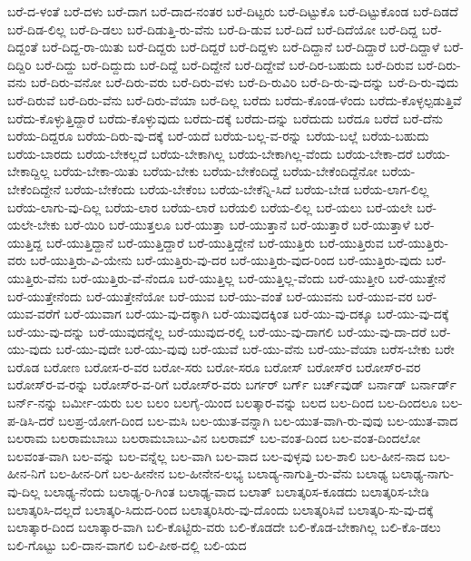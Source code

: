 {ಬರೆ-ದ-ಳಂತೆ
ಬರೆ-ದಳು
ಬರೆ-ದಾಗ
ಬರೆ-ದಾದ-ನಂತರ
ಬರೆ-ದಿಟ್ಟರು
ಬರೆ-ದಿಟ್ಟುಕೊ
ಬರೆ-ದಿಟ್ಟುಕೊಂಡ
ಬರೆ-ದಿಡದೆ
ಬರೆ-ದಿಡ-ಲಿಲ್ಲ
ಬರೆ-ದಿ-ಡಲು
ಬರೆ-ದಿಡುತ್ತಿ-ರು-ವೆನು
ಬರೆ-ದಿ-ಡುವ
ಬರೆ-ದಿದೆ
ಬರೆ-ದಿದೆಯೋ
ಬರೆ-ದಿದ್ದ
ಬರೆ-ದಿದ್ದಂತೆ
ಬರೆ-ದಿದ್ದ-ರಾ-ಯಿತು
ಬರೆ-ದಿದ್ದರು
ಬರೆ-ದಿದ್ದರೆ
ಬರೆ-ದಿದ್ದಳು
ಬರೆ-ದಿದ್ದಾನೆ
ಬರೆ-ದಿದ್ದಾರೆ
ಬರೆ-ದಿದ್ದಾಳೆ
ಬರೆ-ದಿದ್ದಿರಿ
ಬರೆ-ದಿದ್ದು
ಬರೆ-ದಿದ್ದುದು
ಬರೆ-ದಿದ್ದೆ
ಬರೆ-ದಿದ್ದೇನೆ
ಬರೆ-ದಿದ್ದೇವೆ
ಬರೆ-ದಿರ-ಬಹುದು
ಬರೆ-ದಿರುವ
ಬರೆ-ದಿರು-ವನು
ಬರೆ-ದಿರು-ವನೋ
ಬರೆ-ದಿರು-ವರು
ಬರೆ-ದಿರು-ವಳು
ಬರೆ-ದಿ-ರುವಿರಿ
ಬರೆ-ದಿ-ರು-ವು-ದನ್ನು
ಬರೆ-ದಿ-ರು-ವುದು
ಬರೆ-ದಿರುವೆ
ಬರೆ-ದಿರು-ವೆನು
ಬರೆ-ದಿರು-ವೆಯಾ
ಬರೆ-ದಿಲ್ಲ
ಬರೆದು
ಬರೆದು-ಕೊಂಡ-ಳೆಂದು
ಬರೆದು-ಕೊಳ್ಳಲ್ಪಡುತ್ತಿವೆ
ಬರೆದು-ಕೊಳ್ಳುತ್ತಿದ್ದಾರೆ
ಬರೆದು-ಕೊಳ್ಳುವುದು
ಬರೆದು-ದಕ್ಕೆ
ಬರೆದು-ದನ್ನು
ಬರೆದುದು
ಬರೆದೂ
ಬರೆದೆ
ಬರೆ-ದೆನು
ಬರೆಯ-ದಿದ್ದರೂ
ಬರೆಯ-ದಿರು-ವು-ದಕ್ಕೆ
ಬರೆ-ಯದೆ
ಬರೆಯ-ಬಲ್ಲ-ವ-ರನ್ನು
ಬರೆಯ-ಬಲ್ಲೆ
ಬರೆಯ-ಬಹುದು
ಬರೆಯ-ಬಾರದು
ಬರೆಯ-ಬೇಕಲ್ಲದೆ
ಬರೆಯ-ಬೇಕಾಗಿಲ್ಲ
ಬರೆಯ-ಬೇಕಾಗಿಲ್ಲ-ವೆಂದು
ಬರೆಯ-ಬೇಕಾ-ದರೆ
ಬರೆಯ-ಬೇಕಾದ್ದಿಲ್ಲ
ಬರೆಯ-ಬೇಕಾ-ಯಿತು
ಬರೆಯ-ಬೇಕು
ಬರೆಯ-ಬೇಕೆಂದಿದ್ದೆ
ಬರೆಯ-ಬೇಕೆಂದಿದ್ದೆನೋ
ಬರೆಯ-ಬೇಕೆಂದಿದ್ದೇನೆ
ಬರೆಯ-ಬೇಕೆಂದು
ಬರೆಯ-ಬೇಕೆಂಬ
ಬರೆಯ-ಬೇಕೆನ್ನಿ-ಸಿದೆ
ಬರೆಯ-ಬೇಡ
ಬರೆಯ-ಲಾಗ-ಲಿಲ್ಲ
ಬರೆಯ-ಲಾಗು-ವು-ದಿಲ್ಲ
ಬರೆಯ-ಲಾರ
ಬರೆಯ-ಲಾರೆ
ಬರೆಯಲಿ
ಬರೆಯ-ಲಿಲ್ಲ
ಬರೆ-ಯಲು
ಬರೆ-ಯಲೇ
ಬರೆ-ಯಲೇ-ಬೇಕು
ಬರೆ-ಯಿರಿ
ಬರೆ-ಯುತ್ತಲೂ
ಬರೆ-ಯುತ್ತಾ
ಬರೆ-ಯುತ್ತಾನೆ
ಬರೆ-ಯುತ್ತಾರೆ
ಬರೆ-ಯುತ್ತಾಳೆ
ಬರೆ-ಯುತ್ತಿದ್ದ
ಬರೆ-ಯುತ್ತಿದ್ದಾನೆ
ಬರೆ-ಯುತ್ತಿದ್ದಾರೆ
ಬರೆ-ಯುತ್ತಿದ್ದೇನೆ
ಬರೆ-ಯುತ್ತಿರು
ಬರೆ-ಯುತ್ತಿರುವ
ಬರೆ-ಯುತ್ತಿರು-ವರು
ಬರೆ-ಯುತ್ತಿರು-ವಿ-ಯೇನು
ಬರೆ-ಯುತ್ತಿರು-ವು-ದರ
ಬರೆ-ಯುತ್ತಿರು-ವುದ-ರಿಂದ
ಬರೆ-ಯುತ್ತಿರು-ವುದು
ಬರೆ-ಯುತ್ತಿರು-ವೆನು
ಬರೆ-ಯುತ್ತಿರು-ವೆ-ನೆಂದೂ
ಬರೆ-ಯುತ್ತಿಲ್ಲ
ಬರೆ-ಯುತ್ತಿಲ್ಲ-ವೆಂದು
ಬರೆ-ಯುತ್ತೀರಿ
ಬರೆ-ಯುತ್ತೇನೆ
ಬರೆ-ಯುತ್ತೇನೆಂದು
ಬರೆ-ಯುತ್ತೇನೆಯೋ
ಬರೆ-ಯುವ
ಬರೆ-ಯು-ವಂತೆ
ಬರೆ-ಯುವನು
ಬರೆ-ಯುವ-ವರ
ಬರೆ-ಯುವ-ವರೆಗೆ
ಬರೆ-ಯುವಾಗ
ಬರೆ-ಯು-ವು-ದಕ್ಕಾಗಿ
ಬರೆ-ಯುವುದಕ್ಕಿಂತ
ಬರೆ-ಯು-ವು-ದಕ್ಕೂ
ಬರೆ-ಯು-ವು-ದಕ್ಕೆ
ಬರೆ-ಯು-ವು-ದನ್ನು
ಬರೆ-ಯುವುದನ್ನೆಲ್ಲ
ಬರೆ-ಯುವುದ-ರಲ್ಲಿ
ಬರೆ-ಯು-ವು-ದಾಗಲಿ
ಬರೆ-ಯು-ವು-ದಾ-ದರೆ
ಬರೆ-ಯು-ವುದು
ಬರೆ-ಯು-ವುದೇ
ಬರೆ-ಯು-ವುವು
ಬರೆ-ಯುವೆ
ಬರೆ-ಯು-ವೆನು
ಬರೆ-ಯು-ವೆಯಾ
ಬರೆಸ-ಬೇಕು
ಬರೇ
ಬರೊಡ
ಬರೋಣ
ಬರೋಸ-ರ-ವರ
ಬರೋ-ಸರು
ಬರೋ-ಸರೂ
ಬರೋಸ್
ಬರೋಸ್‌ರ
ಬರೋಸ್‌ರ-ವರ
ಬರೋಸ್‌ರ-ವ-ರನ್ನು
ಬರೋಸ್‌ರ-ವ-ರಿಗೆ
ಬರೋಸ್‌ರ-ವರು
ಬರ್ಗರ್
ಬರ್ಗ್
ಬರ್ಚ್‌ವುಡ್
ಬರ್ನಾಡ್
ಬರ್ನಾರ್ಡ್
ಬರ್ನ್‌-ನನ್ನು
ಬರ್ಮೀ-ಯರು
ಬಲ
ಬಲಂ
ಬಲಗೈ-ಯಿಂದ
ಬಲತ್ಕಾರ-ವನ್ನು
ಬಲದ
ಬಲ-ದಿಂದ
ಬಲ-ದಿಂದಲೂ
ಬಲ-ಪ-ಡಿಸಿ-ದರೆ
ಬಲಪ್ರ-ಯೋಗ-ದಿಂದ
ಬಲ-ಮಸಿ
ಬಲ-ಯುತ-ವನ್ನಾಗಿ
ಬಲ-ಯುತ-ವಾಗಿ-ರು-ವುವು
ಬಲ-ಯುತ-ವಾದ
ಬಲರಾಮ
ಬಲರಾಮಬಾಬು
ಬಲರಾಮಬಾಬು-ವಿನ
ಬಲರಾಮ್
ಬಲ-ವಂತ-ದಿಂದ
ಬಲ-ವಂತ-ದಿಂದಲೋ
ಬಲವಂತ-ವಾಗಿ
ಬಲ-ವನ್ನು
ಬಲ-ವನ್ನೆಲ್ಲ
ಬಲ-ವಾಗಿ
ಬಲ-ವಾದ
ಬಲ-ವುಳ್ಳವು
ಬಲ-ಶಾಲಿ
ಬಲ-ಹೀನ-ನಾದ
ಬಲ-ಹೀನ-ನಿಗೆ
ಬಲ-ಹೀನ-ರಿಗೆ
ಬಲ-ಹೀನೇನ
ಬಲ-ಹೀನೇನ-ಲಭ್ಯ
ಬಲಾಡ್ಯ-ನಾಗುತ್ತಿ-ರು-ವೆನು
ಬಲಾಢ್ಯ
ಬಲಾಢ್ಯ-ನಾಗು-ವು-ದಿಲ್ಲ
ಬಲಾಢ್ಯ-ನೆಂದು
ಬಲಾಢ್ಯ-ರಿ-ಗಿಂತ
ಬಲಾಢ್ಯ-ವಾದ
ಬಲಾತ್
ಬಲಾತ್ಕರಿಸ-ಕೂಡದು
ಬಲಾತ್ಕರಿಸ-ಬೇಡಿ
ಬಲಾತ್ಕರಿಸಿ-ದಲ್ಲದೆ
ಬಲಾತ್ಕರಿ-ಸಿದುದ-ರಿಂದ
ಬಲಾತ್ಕರಿಸಿರು-ವು-ದೊಂದು
ಬಲಾತ್ಕರಿಸಿವೆ
ಬಲಾತ್ಕರಿ-ಸು-ವು-ದಕ್ಕೆ
ಬಲಾತ್ಕಾರ-ದಿಂದ
ಬಲಾತ್ಕಾರ-ವಾಗಿ
ಬಲಿ-ಕೊಟ್ಟಿರು-ವರು
ಬಲಿ-ಕೊಡದೇ
ಬಲಿ-ಕೊಡ-ಬೇಕಾಗಿಲ್ಲ
ಬಲಿ-ಕೊ-ಡಲು
ಬಲಿ-ಗೊಟ್ಟು
ಬಲಿ-ದಾನ-ವಾಗಲಿ
ಬಲಿ-ಪೀಠ-ದಲ್ಲಿ
ಬಲಿ-ಯದ
}
